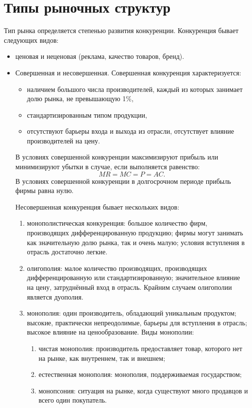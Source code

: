\section{Типы рыночных структур}

Тип рынка определяется степенью развития конкуренции. Конкуренция бывает
следующих видов:
\begin{itemize}
    \item ценовая и неценовая (реклама, качество товаров, бренд).
    \item Совершенная и несовершенная.
    Совершенная конкуренция характеризуется:
    \begin{itemize}
        \item наличием большого числа производителей,  каждый из которых
            занимает долю рынка, не превышающую 1\%,
        \item стандартизированным типом продукции,
        \item отсутствуют барьеры входа и выхода из отрасли, отсутствует влияние
            производителей на цену.
    \end{itemize}
    В условиях совершенной конкуренции максимизируют прибыль или минимизируют
    убытки в случае, если выполняется равенство:
    \[
        MR = MC = P = AC.
    \]
    В условиях совершенной конкуренции в долгосрочном периоде прибыль фирмы
    равна нулю.

    Несовершенная конкуренция бывает нескольких видов:
    \begin{enumerate}
        \item монополистическая конкуренция: большое количество фирм,
        производящих дифференцированную продукцию; фирмы могут занимать как
        значительную долю рынка, так и очень малую; условия вступления в отрасль
        достаточно легкие.
        \item олигополия: малое количество производящих, производящих
        дифференцированную или стандартизированную; значительное влияние
        на цену, затруднённый вход в отрасль. Крайним случаем олигополии
        является дуополия.
        \item монополия: один производитель, обладающий уникальным продуктом;
        высокие, практически непреодолимые, барьеры для вступления в отрасль;
        высокое влияние на ценообразование.
        Виды монополии:
        \begin{enumerate}
            \item чистая монополия: производитель предоставляет товар, которого
                нет на рынке, как внутреннем, так и внешнем;
            \item естественная монополия: монополия, поддерживаемая
                государством;
            \item монопсония: ситуация на рынке, когда существуют
                много продавцов и всего один покупатель.
        \end{enumerate}
        

\end{enumerate}
\end{itemize}
